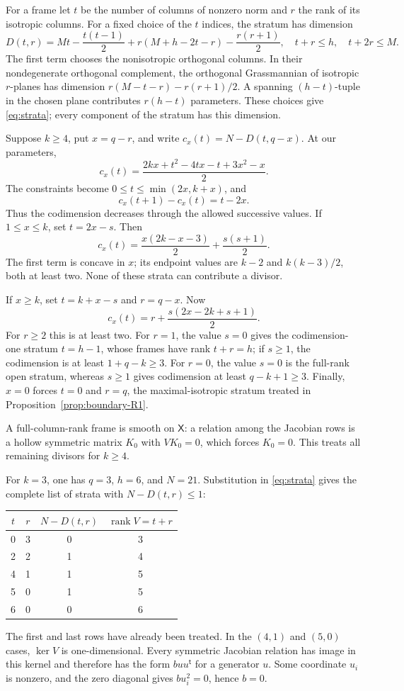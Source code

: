 \documentclass[11pt]{article}
\theoremstyle{definition}
\theoremstyle{remark}
\numberwithin{equation}{section}
\DeclareMathOperator{\rank}{rank}
\newcommand{\XX}{\mathsf X}
\begin{document}
For a frame let $t$ be the number of columns of nonzero norm and $r$
the rank of its isotropic columns. For a fixed choice of the $t$
indices, the stratum has dimension
\begin{equation}\label{eq:strata}
 D(t,r)=Mt-\frac{t(t-1)}2
       +r(M+h-2t-r)-\frac{r(r+1)}2,
 \quad t+r\leq h,\quad t+2r\leq M.
\end{equation}
The first term chooses the nonisotropic orthogonal columns. In their
nondegenerate orthogonal complement, the orthogonal Grassmannian of
isotropic $r$-planes has dimension $r(M-t-r)-r(r+1)/2$.
A spanning $(h-t)$-tuple in the chosen plane contributes $r(h-t)$
parameters. These choices give \eqref{eq:strata}; every component
of the stratum has this dimension.

Suppose $k\geq4$, put $x=q-r$, and write $c_x(t)=N-D(t,q-x)$.
At our parameters,
\begin{equation}\label{eq:strata-codimension}
 c_x(t)=\frac{2kx+t^2-4tx-t+3x^2-x}{2}.
\end{equation}
The constraints become $0\leq t\leq\min(2x,k+x)$, and
\[
 c_x(t+1)-c_x(t)=t-2x.
\]
Thus the codimension decreases through the allowed successive values.
If $1\leq x\leq k$, set $t=2x-s$. Then
\[
 c_x(t)=\frac{x(2k-x-3)}2+\frac{s(s+1)}2.
\]
The first term is concave in $x$; its endpoint values are $k-2$
and $k(k-3)/2$, both at least two. None of these strata can
contribute a divisor.

If $x\geq k$, set $t=k+x-s$ and $r=q-x$. Now
\[
 c_x(t)=r+\frac{s(2x-2k+s+1)}2.
\]
For $r\geq2$ this is at least two. For $r=1$, the value $s=0$
gives the codimension-one stratum $t=h-1$, whose frames have
rank $t+r=h$; if $s\geq1$, the codimension is at least
$1+q-k\geq3$. For $r=0$, the value $s=0$ is the full-rank open
stratum, whereas $s\geq1$ gives codimension at least $q-k+1\geq3$.
Finally, $x=0$ forces $t=0$ and $r=q$, the maximal-isotropic
stratum treated in Proposition~\ref{prop:boundary-R1}.

A full-column-rank frame is smooth on $\XX$: a relation among the
Jacobian rows is a hollow symmetric matrix $K_0$ with $VK_0=0$,
which forces $K_0=0$. This treats all remaining divisors for $k\geq4$.

For $k=3$, one has $q=3$, $h=6$, and $N=21$. Substitution in
\eqref{eq:strata} gives the complete list of strata with
$N-D(t,r)\leq1$:
\begin{center}
\begin{tabular}{@{}c c c c@{}}
\toprule
$t$&$r$&$N-D(t,r)$&$\rank V=t+r$\\
\midrule
0&3&0&3\\
2&2&1&4\\
4&1&1&5\\
5&0&1&5\\
6&0&0&6\\
\bottomrule
\end{tabular}
\end{center}
The first and last rows have already been treated. In the
$(4,1)$ and $(5,0)$ cases, $\ker V$ is one-dimensional.
Every symmetric Jacobian relation has image in this kernel and
therefore has the form $b uu^{\mathsf t}$ for a generator $u$.
Some coordinate $u_i$ is nonzero, and the zero diagonal gives
$b u_i^2=0$, hence $b=0$.
\end{document}
